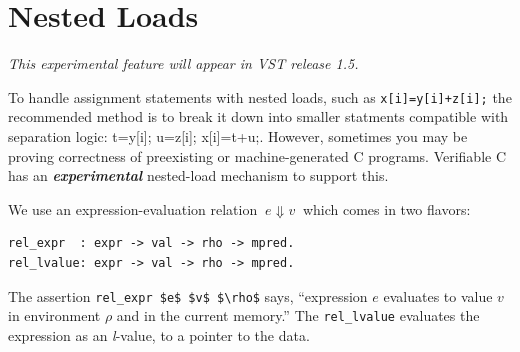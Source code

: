 \documentclass[12pt,fleqn,openany,oneside,showtrims]{memoir}
\newcommand{\ychapter}[2]{\chapter[#1]{#1 \hfill \normalsize #2}}
\begin{document}
\ychapter{Nested Loads}{}

\emph{This experimental feature will appear in VST release 1.5.}

To handle assignment statements with nested loads, such as
\lstinline{x[i]=y[i]+z[i];}
the recommended method is to break it down into smaller statments
compatible with separation logic: {t=y[i]; u=z[i]; x[i]=t+u;}.
However, sometimes you may be proving correctness of preexisting
or machine-generated C programs.  Verifiable C
has an \textbf{\textit{experimental}} nested-load mechanism to
support this.

We use an expression-evaluation relation $~e\Downarrow v~$
which comes in two flavors:
\begin{lstlisting}
rel_expr  : expr -> val -> rho -> mpred.
rel_lvalue: expr -> val -> rho -> mpred.
\end{lstlisting}
The assertion \lstinline{rel_expr $e$ $v$ $\rho$} says,
``expression $e$ evaluates to value $v$ in environment $\rho$
and in the current memory.''  The \lstinline{rel_lvalue} evaluates
the expression as an \emph{l}-value, to a pointer to the data.
\end{document}
